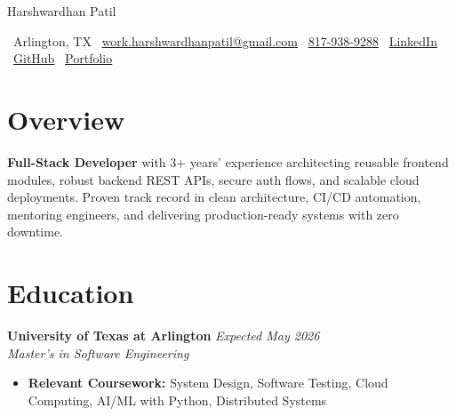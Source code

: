\documentclass[10pt, letterpaper]{article}
\newenvironment{highlights}{\begin{itemize}[topsep=0.10 cm, parsep=0.10 cm, partopsep=0pt, itemsep=2pt, leftmargin=10pt]}{\end{itemize}}
\begin{document}
\newcommand{\AND}{\unskip\cleaders\copy\ANDbox\hskip\wd\ANDbox\ignorespaces}
\newsavebox\ANDbox
\sbox\ANDbox{$|$}

\begin{center}
    {\fontsize{25 pt}{25 pt}\selectfont Harshwardhan Patil}

    \vspace{10 pt}
    \normalsize
    \faMapMarker*\ Arlington, TX\hspace{1.2em}
    \faEnvelope\ \href{mailto:work.harshwardhanpatil@gmail.com}{work.harshwardhanpatil@gmail.com}\hspace{1.2em}
    \faPhone\ \href{tel:8179389288}{817-938-9288}\hspace{1.2em}
    \faLinkedin\ \href{https://www.linkedin.com/in/harshwardhanpatil23/}{LinkedIn}\hspace{1.2em}
    \faGithub\ \href{https://github.com/buffden}{GitHub}\hspace{1.2em}
    \faGlobe\ \href{https://buffden.github.io/buffden-portfolio/}{Portfolio}
\end{center}

\vspace{0.1 cm}
\newcommand{\educationentry}[4]{%
  \noindent\textbf{#1} \hfill \textit{#2}\\
  \textit{#3} \\
  #4
}
\section{Overview}
\textbf{Full-Stack Developer} with 3+ years’ experience architecting reusable frontend modules, robust backend REST APIs, secure auth flows, and scalable cloud deployments. Proven track record in clean architecture, CI/CD automation, mentoring engineers, and delivering production-ready systems with zero downtime.

\section{Education}
\educationentry
    {University of Texas at Arlington}
    {Expected May 2026}
    {Master’s in Software Engineering}
    {
    \begin{highlights}
        \item \textbf{Relevant Coursework:} System Design, Software Testing, Cloud Computing, AI/ML with Python, Distributed Systems
        \end{highlights}
    }
    
\end{document}
